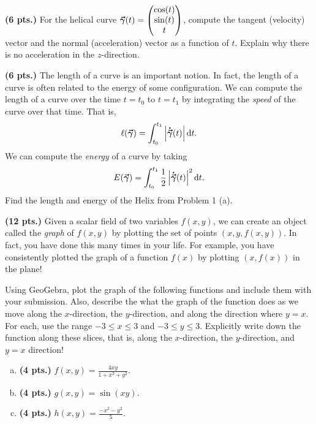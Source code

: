 \documentclass[12pt]{article} %
\begin{document}
\vspace*{0.5cm}

\begin{problem}
\textbf{(6 pts.)} For the helical curve $\boldsymbol{\vec{\gamma}}(t) = \begin{pmatrix} \cos(t) \\ \sin(t) \\ t \end{pmatrix}$, compute the tangent (velocity) vector and the normal (acceleration) vector as a function of $t$. Explain why there is no acceleration in the $z$-direction.
\end{problem}

\vspace*{0.5cm}

\begin{problem}
\textbf{(6 pts.)} The length of a curve is an important notion. In fact, the length of a curve is often related to the energy of some configuration. We can compute the length of a curve over the time $t=t_0$ to $t=t_1$ by integrating the \emph{speed} of the curve over that time.  That is,
\[
\ell(\boldsymbol{\vec{\gamma}}) = \int_{t_0}^{t_1} \left|\boldsymbol{\dot{\vec{\gamma}}}(t)\right| \mathop{}\!\mathrm{d} t.
\]
We can compute the \emph{energy} of a curve by taking
\[
E(\boldsymbol{\vec{\gamma}}) = \int_{t_0}^{t_1} \frac{1}{2} \left| \boldsymbol{\dot{\vec{\gamma}}}(t)\right|^2 \mathop{}\!\mathrm{d} t.
\]
Find the length and energy of the Helix from Problem 1 (a).
\end{problem}

\vspace*{0.5cm}

\begin{problem}
\textbf{(12 pts.)} Given a scalar field of two variables $f(x,y)$, we can create an object called the \emph{graph} of $f(x,y)$ by plotting the set of points $(x,y,f(x,y))$. In fact, you have done this many times in your life. For example, you have consistently plotted the graph of a function $f(x)$ by plotting $(x,f(x))$ in the plane!

Using GeoGebra, plot the graph of the following functions and include them with your submission.  Also, describe the what the graph of the function does as we move along the $x$-direction, the $y$-direction, and along the direction where $y=x$. For each, use the range $-3\leq x \leq 3$ and $-3\leq y \leq 3$. Explicitly write down the function along these slices, that is, along the $x$-direction, the $y$-direction, and $y=x$ direction!
\begin{enumerate}[(a)]
	\item \textbf{(4 pts.)} $f(x,y) = \frac{4xy}{1+x^2+y^2}$.
	\item \textbf{(4 pts.)} $g(x,y) = \sin(xy)$.
	\item \textbf{(4 pts.)} $h(x,y) = \frac{-x^2-y^2}{5}$.
\end{enumerate}
\end{problem}
\end{document}
